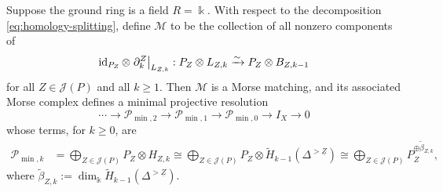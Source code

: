 \documentclass[a4paper,leqno]{amsart}
\begin{document}
\begin{thm}\label{thm:minimal-resolution}
Suppose the ground ring is a field $R=\Bbbk$. With respect to the decomposition \eqref{eq:homology-splitting}, define $\mathcal M$ to be the collection of all nonzero components of 
\begin{equation}
 \operatorname{id}_{P_Z}\otimes\left.\partial^Z_k\right|_{L_{Z,k}}:
 P_Z\otimes L_{Z,k}\xrightarrow{\sim}P_Z\otimes B_{Z,k-1}
 \label{eq:morse-matching}
\end{equation}
for all $Z\in \mathcal{J}(P)$ and all $k\ge 1$.
Then $\mathcal M$ is a Morse matching, and its associated Morse complex defines a minimal projective resolution
\[
 \cdots\longrightarrow\mathcal P_{\min,2}
 \longrightarrow\mathcal P_{\min,1}
 \longrightarrow\mathcal P_{\min,0}
 \longrightarrow I_X\longrightarrow0
\]
whose terms, for $k\geq0$, are
\begin{equation}
 \begin{aligned}
 \mathcal P_{\min,k}
 &=\bigoplus_{Z\in\mathcal J(P)}P_Z\otimes H_{Z,k} \cong\bigoplus_{Z\in\mathcal J(P)}
 P_Z\otimes\widetilde H_{k-1}(\Delta^{>\underline{Z}})
 \cong\bigoplus_{Z\in\mathcal J(P)}
 P_Z^{\oplus\widetilde\beta_{Z,k}},
 \end{aligned}
 \label{eq:minimal-terms}
\end{equation}
where $\widetilde\beta_{Z,k}:= \dim_{\Bbbk}\widetilde H_{k-1}(\Delta^{>\underline{Z}})$.
\end{thm}
\end{document}
